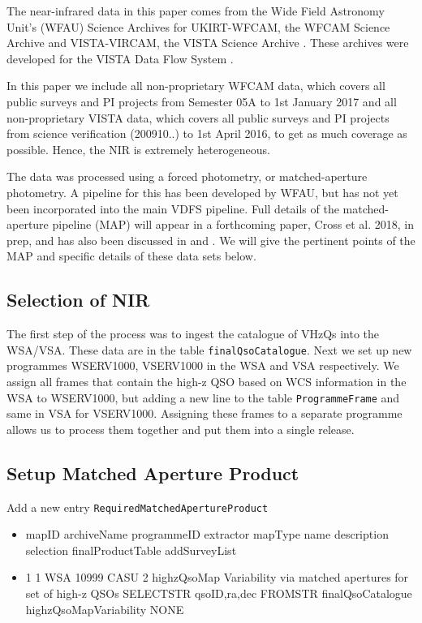 \documentclass[usenatbib]{mnras}
\begin{document}
The near-infrared data in this paper comes from the Wide Field Astronomy Unit's
(WFAU) Science Archives for UKIRT-WFCAM, the WFCAM Science Archive
\citep[WSA][]{WSA} and VISTA-VIRCAM, the VISTA Science Archive
\citep[VSA][]{VSA}. These archives were developed for the VISTA Data Flow System
\citep[VDFS][]{VDFS}.

In this paper we include all non-proprietary WFCAM data, which covers all
public surveys and PI projects from Semester 05A to 1st January 2017 and all
non-proprietary VISTA data, which covers all public surveys and PI projects from
science verification (200910..) to 1st April 2016, to get as much coverage as
possible. Hence, the NIR is extremely heterogeneous. 

The data was processed using a forced photometry, or matched-aperture
photometry. A pipeline for this has been developed by WFAU, but
has not yet been incorporated into the main VDFS pipeline. Full details of the
matched-aperture pipeline (MAP) will appear in a forthcoming paper, Cross et al.
2018, in prep, and has also been discussed in \citet{Cross2013} and \citet{Cross2017}.
We will give the pertinent points of the MAP and specific details of these data sets below.


\subsection{Selection of NIR}

The first step of the process was to ingest the catalogue of VHzQs into
the WSA/VSA. These data are in the table \verb+finalQsoCatalogue+. Next we set
up new programmes WSERV1000, VSERV1000 in the WSA and VSA respectively. We
assign all frames that contain the high-z QSO based on WCS information in the
WSA to WSERV1000, but adding a new line to the table \verb+ProgrammeFrame+ and
same in VSA for VSERV1000. Assigning these frames to a separate programme allows
us to process them together and put them into a single release. 

\subsection{Setup Matched Aperture Product}

Add a new entry \verb+RequiredMatchedApertureProduct+

\begin{itemize}
\item mapID	archiveName	programmeID	extractor	mapType	name	description	selection	finalProductTable	addSurveyList
\item 1	1	WSA	10999	CASU	2	highzQsoMap	Variability via matched apertures for set of high-z QSOs	SELECTSTR qsoID,ra,dec FROMSTR finalQsoCatalogue	highzQsoMapVariability	NONE
\end{itemize}
\end{document}
